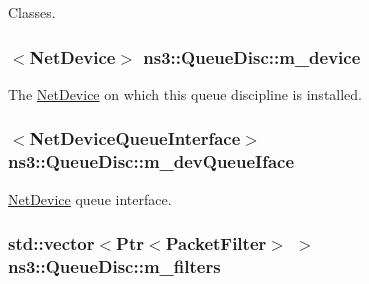 Classes. 

\subsubsection[{\texorpdfstring{m\+\_\+device}{m_device}}]{$<${\bf Net\+Device}$>$ ns3\+::\+Queue\+Disc\+::m\+\_\+device\hspace{0.3cm}{\ttfamily [private]}}\hypertarget{classns3_1_1QueueDisc_ad9a47fe0eb33b8e1ef760966b1ad6b7c}{}\label{classns3_1_1QueueDisc_ad9a47fe0eb33b8e1ef760966b1ad6b7c}


The \hyperlink{classns3_1_1NetDevice}{Net\+Device} on which this queue discipline is installed. 

\subsubsection[{\texorpdfstring{m\+\_\+dev\+Queue\+Iface}{m_devQueueIface}}]{$<${\bf Net\+Device\+Queue\+Interface}$>$ ns3\+::\+Queue\+Disc\+::m\+\_\+dev\+Queue\+Iface\hspace{0.3cm}{\ttfamily [private]}}\hypertarget{classns3_1_1QueueDisc_a265febf26e8325dbb3ba1f905ea1912d}{}\label{classns3_1_1QueueDisc_a265febf26e8325dbb3ba1f905ea1912d}


\hyperlink{classns3_1_1NetDevice}{Net\+Device} queue interface. 

\subsubsection[{\texorpdfstring{m\+\_\+filters}{m_filters}}]{\setlength{\rightskip}{0pt plus 5cm}std\+::vector$<${\bf Ptr}$<${\bf Packet\+Filter}$>$ $>$ ns3\+::\+Queue\+Disc\+::m\+\_\+filters\hspace{0.3cm}{\ttfamily [private]}}\hypertarget{classns3_1_1QueueDisc_a04bc2a1d90315527c6ba411eb2cb722a}{}\label{classns3_1_1QueueDisc_a04bc2a1d90315527c6ba411eb2cb722a}


